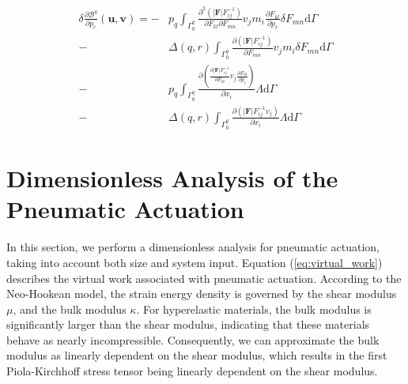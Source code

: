\documentclass[journal]{IEEEtran}
\theoremstyle{definition}
\begin{document}
\begin{equation}
  \begin{split}
    \delta \frac{\partial{\mathcal{B}^q}}{\partial p_r}(\mathbf{u}, \mathbf{v}) = -& p_q\int_{\Gamma_0^q} 
     \frac{\partial^2 \left(\left|\mathbf{F}\right|F_{ij}^{-1}\right)}{\partial F_{kl} \partial F_{mn}}  v_j m_i \frac{\partial F_{kl}}{\partial p_r}
    \delta F_{mn} \mathrm{d}\Gamma \\
    - &\Delta \left(q,r\right) \int_{\Gamma^q_0} \frac{\partial \left(\left|\mathbf{F}\right|F_{ij}^{-1}\right)}{\partial F_{mn}} v_j m_i \delta F_{mn} \mathrm{d}\Gamma \\
    - & p_q \int_{\Gamma^q_0} \frac{\partial \left(\frac{\partial \left|\mathbf{F}\right|F_{ij}^{-1}}{\partial F_{kl}}  v_j
    \frac{\partial F_{kl}}{\partial p_r}\right)}{\partial x_i} \Lambda \mathrm{d}\Gamma \\
    - &\Delta \left(q,r\right) \int_{\Gamma^q_0} \frac{\partial \left(\left|\mathbf{F}\right|F_{ij}^{-1} v_j\right)}{\partial x_i}\Lambda\mathrm{d}\Gamma
  \end{split}
  \label{eq:variation_Bp_xi}
\end{equation}



\section{Dimensionless Analysis of the Pneumatic Actuation}
\label{sec:normalization}

In this section, we perform a dimensionless analysis for pneumatic actuation, taking into account both size and system input. Equation (\ref{eq:virtual_work}) describes the virtual work associated with pneumatic actuation. According to the Neo-Hookean model, the strain energy density is governed by the shear modulus $\mu$, and the bulk modulus $\kappa$. For hyperelastic materials, the bulk modulus is significantly larger than the shear modulus, indicating that these materials behave as nearly incompressible. Consequently, we can approximate the bulk modulus as linearly dependent on the shear modulus, which results in the first Piola-Kirchhoff stress tensor being linearly dependent on the shear modulus.
\end{document}
